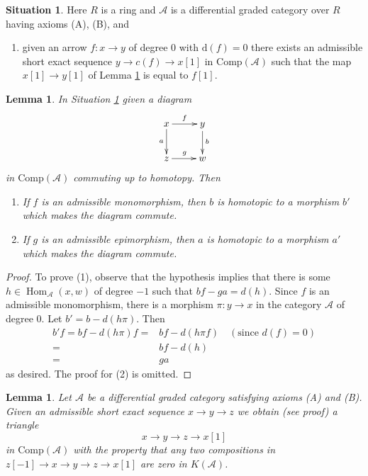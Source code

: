 \documentclass{stacks-project}
\theoremstyle{plain}
\newtheorem{lemma}[subsection]{Lemma}
\theoremstyle{definition}
\newtheorem{situation}[subsection]{Situation}
\theoremstyle{remark}
\numberwithin{equation}{subsection}
\def\Hom{\mathop{\mathrm{Hom}}\nolimits}
\begin{document}
\begin{situation}
\label{situation-ABC}
Here $R$ is a ring and $\mathcal{A}$ is a differential graded category
over $R$ having axioms (A), (B), and
\begin{enumerate}
\item[(C)] given an arrow $f : x \to y$ of degree $0$ with
$\text{d}(f) = 0$ there exists an admissible short exact sequence
$y \to c(f) \to x[1]$ in $\text{Comp}(\mathcal{A})$ such that the map
$x[1] \to y[1]$ of Lemma \ref{lemma-get-triangle} is equal to $f[1]$.
\end{enumerate}
\end{situation}

\begin{lemma}
\label{lemma-homo-change}
In Situation \ref{situation-ABC} given a diagram
$$
\xymatrix{x\ar[r]^f\ar[d]_a & y\ar[d]^b\\
z\ar[r]^g & w}
$$
in $\text{Comp}(\mathcal{A})$ commuting up to homotopy. Then
\begin{enumerate}
\item If $f$ is an admissible monomorphism, then $b$ is homotopic
to a morphism $b'$ which makes the diagram commute.
\item If $g$ is an admissible epimorphism, then $a$ is homotopic
to a morphism $a'$ which makes the diagram commute.
\end{enumerate}
\end{lemma}

\begin{proof}
To prove (1), observe that the hypothesis implies that there is some
$h\in\Hom_{\mathcal{A}}(x,w)$ of degree $-1$ such that $bf-ga=d(h)$.
Since $f$ is an admissible monomorphism, there is a morphism
$\pi : y \to x$ in the category $\mathcal{A}$ of degree $0$.
Let $b' = b - d(h\pi)$. Then
\begin{align*}
b'f = bf - d(h\pi)f
= &
bf - d(h\pi f) \quad (\text{since }d(f) = 0) \\
= &
bf-d(h) \\
= &
ga
\end{align*}
as desired. The proof for (2) is omitted.
\end{proof}

\begin{lemma}
\label{lemma-get-triangle}
Let $\mathcal{A}$ be a differential graded category satisfying
axioms (A) and (B). Given an admissible short exact sequence
$x \to y \to z$ we obtain (see proof) a triangle
$$
x \to y \to z \to x[1]
$$
in $\text{Comp}(\mathcal{A})$ with the property that any two compositions
in $z[-1] \to x \to y \to z \to x[1]$ are zero in $K(\mathcal{A})$.
\end{lemma}
\end{document}
